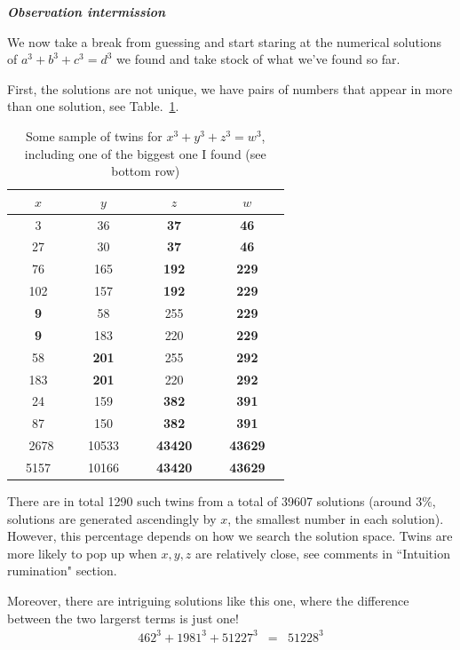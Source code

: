 \documentclass[aps,preprint,preprintnumbers,nofootinbib,showpacs,prd]{revtex4-1}
\newcommand{\nbea}{\begin{eqnarray*}}
\newcommand{\neea}{\end{eqnarray*}}
\begin{document}
\bigskip\textbf{\textit{Observation intermission}}

We now take a break from guessing and start staring at the numerical solutions of $a^3 + b^3 + c^3 = d^3$ we found and take stock of what we've found so far.

First, the solutions are not unique, we have pairs of numbers that appear in more than one solution, see Table.~\ref{Tab:2}.
%
\begin{table}[]
\centering
\caption{Some sample of twins for $x^3 + y^3 + z^3 = w^3$, including one of the biggest one I found (see bottom row)}
\label{Tab:2}
\begin{tabular}{||c c c c||}
\hline
$x$ & $y$ & $z$ & $w$ \\ \hline 
3 & 36 & {\bf 37} & {\bf 46} \\
27 & 30 & {\bf 37} & {\bf 46} \\ \hline
76 & 165 & {\bf 192} & {\bf 229} \\
102 & 157 & {\bf 192} & {\bf 229} \\ \hline
{\bf 9} & 58 & 255 & {\bf 229} \\
{\bf 9} & 183 & 220 & {\bf 229} \\ \hline
58 & {\bf 201} & 255 & {\bf 292} \\
183 & {\bf 201} & 220 & {\bf 292} \\ \hline
24 & 159 & {\bf 382} & {\bf 391} \\
87 & 150 & {\bf 382} & {\bf 391} \\ \hline
~2678 & 10533 & {\bf 43420} & {\bf 43629} \\
~~5157~~& ~~10166~~ & ~~{\bf 43420}~~ & ~~{\bf 43629}~~ \\ \hline
\end{tabular}
\end{table}
%
There are in total 1290 such twins from a total of 39607 solutions (around $3\%$, solutions are generated ascendingly by $x$, the smallest number in each solution). However, this percentage depends on how we search the solution space. Twins are more likely to pop up when $x, y, z$ are relatively close, see comments in ``Intuition rumination" section.

Moreover, there are intriguing solutions like this one, where the difference between the two largerst terms is just one!
%
\nbea
462^3 + 1981^3 + 51227^3 & = & 51228^3
\neea
%
\end{document}
